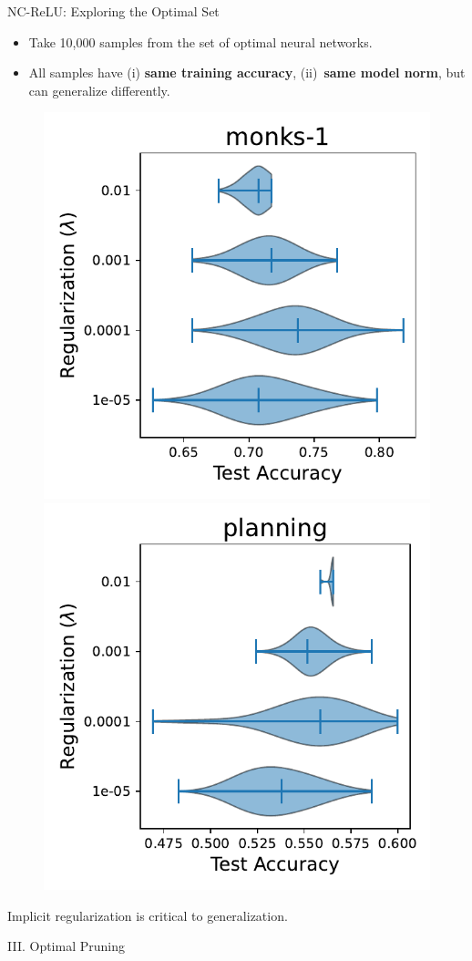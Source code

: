 \documentclass[usenames,dvipsnames,mathserif,notheorems]{beamer}
\newcommand{\good}[1]{\textcolor{good}{#1}}
\begin{document}
\begin{frame}{NC-ReLU: Exploring the Optimal Set}
	\begin{itemize}
		\item Take 10,000 samples from the set of optimal neural networks.
		      \pause
		\item All samples have (i) \textbf{same training accuracy},
		      (ii)~\textbf{same model norm}, but can generalize differently.
		      \pause
	\end{itemize}

	\begin{figure}[t]
		\centering
		\includegraphics[width=0.48\linewidth]{assets/dist_paper_monks-1.pdf}
		\includegraphics[width=0.48\linewidth]{assets/dist_paper_planning.pdf}
	\end{figure}

	\pause
	\begin{center}
        \good{Implicit regularization} is critical to generalization.
	\end{center}

\end{frame}



\begin{frame}{}
	\begin{center}
		\huge III. Optimal Pruning
	\end{center}
\end{frame}
\end{document}
